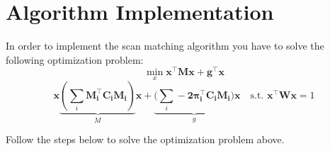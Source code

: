 \documentclass[letta4 paper]{article}
\numberwithin{equation}{section}
\newcommand{\0}{\mathbf{0}}
\begin{document}
	\section{Algorithm Implementation}
	In order to implement the scan matching algorithm you have to solve the following optimization problem:
	\begin{equation}
	\min_x\mathbf{x^\intercal Mx}+\mathbf{g^\intercal x}
	\end{equation}
	\begin{equation}
	\mathbf{ x}\underbrace{(\sum_i \mathbf{M_i^\intercal C_iM_i})}_{M}\mathbf{ x}
	 + \underbrace{(\sum_i -\mathbf{2\pi_i^\intercal C_iM_i)}}_{g}\mathbf{ x}
	 \quad \text{s.t. }  \mathbf{ x^\intercal Wx}=1
	\end{equation}

	
	\noindent Follow the steps below to solve the optimization problem above.
\end{document}
